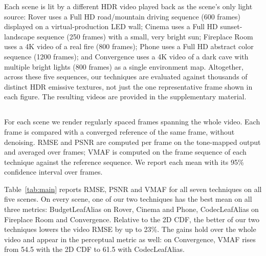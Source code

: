 \documentclass[acmtog,review]{acmart}
\begin{document}
Each scene is lit by a different HDR video played back as the
scene's only light source: Rover uses a Full HD road/mountain driving sequence
(600 frames) displayed on a virtual-production LED wall; Cinema uses a Full HD
sunset-landscape sequence (250 frames) with a small, very bright sun; Fireplace Room uses a 4K video of a real fire (800 frames); Phone uses
a Full HD abstract color sequence (1200 frames); and
Convergence uses a 4K video of a dark cave with multiple bright lights (800 frames) as a single environment map. Altogether, across these five sequences, our techniques are evaluated against thousands of distinct HDR emissive
textures, not just the one representative frame shown in each figure. The resulting videos are provided in the supplementary material.


\subsection{\texorpdfstring{}{Full-video quality}}
\label{sec:video}

\newbegin
For each scene we render regularly spaced frames spanning the whole video. Each frame is compared with a converged reference of the same frame, without denoising. RMSE and PSNR are computed per frame on the tone-mapped output and averaged over frames; VMAF is computed on the frame sequence of each technique against the reference sequence. We report each mean with its 95\% confidence interval over frames.

Table~\ref{tab:main} reports RMSE, PSNR and VMAF for all seven techniques on all five scenes. On every scene, one of our two techniques has the best mean on all three metrics: BudgetLeafAlias on Rover, Cinema and Phone, CodecLeafAlias on Fireplace Room and Convergence. Relative to the 2D CDF, the better of our two techniques lowers the video RMSE by up to 23\%. The gains hold over the whole video and appear in the perceptual metric as well: on Convergence, VMAF rises from 54.5 with the 2D CDF to 61.5 with CodecLeafAlias.
\end{document}
